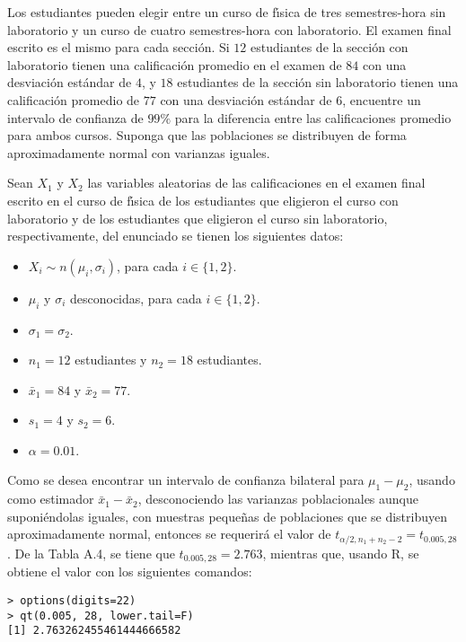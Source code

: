 \begin{enunciado}
 Los estudiantes pueden elegir entre un curso de f\'{\i}sica de tres semestres-hora sin laboratorio y un curso de cuatro semestres-hora con laboratorio. El examen final escrito es el mismo para cada secci\'on. Si $12$ estudiantes de la secci\'on con laboratorio tienen una calificaci\'on promedio en el examen de $84$ con una desviaci\'on est\'andar de $4$, y $18$ estudiantes de la secci\'on sin laboratorio tienen una calificaci\'on promedio de $77$ con una desviaci\'on est\'andar de $6$, encuentre un intervalo de confianza de $99\%$ para la diferencia entre las calificaciones promedio para ambos cursos. Suponga que las poblaciones se distribuyen de forma aproximadamente normal con varianzas iguales.
\end{enunciado}

\begin{solucion}
 Sean $X_1$ y $X_2$ las variables aleatorias de las calificaciones en el examen final escrito en el curso de f\'{\i}sica de los estudiantes que eligieron el curso con laboratorio y de los estudiantes que eligieron el curso sin laboratorio, respectivamente, del enunciado se tienen los siguientes datos:
 \begin{itemize}
  \item $X_i \sim n(\mu_i, \sigma_i)$, para cada $i\in\{ 1, 2 \}$.
  \item $\mu_i$ y $\sigma_i$ desconocidas, para cada $i \in \{ 1, 2 \}$.
  \item $\sigma_1 = \sigma_2$.
  \item $n_1 = 12$ estudiantes y $n_2 = 18$ estudiantes.
  \item $\bar{x}_1 = 84$ y $\bar{x}_2 = 77$.
  \item $s_1 = 4$ y $s_2 = 6$.
  \item $\alpha = 0.01$.
 \end{itemize}
 Como se desea encontrar un intervalo de confianza bilateral para $\mu_1 - \mu_2$, usando como estimador $\bar{x}_1 - \bar{x}_2$, desconociendo las varianzas poblacionales aunque suponi\'endolas iguales, con muestras peque\~nas de poblaciones que se distribuyen aproximadamente normal, entonces se requerir\'a el valor de $t_{\alpha/2,n_1+n_2-2} = t_{0.005,28}$. De la Tabla A.4, se tiene que $t_{0.005,28} = 2.763$, mientras que, usando R, se obtiene el valor con los siguientes comandos:
 \begin{verbatim}
> options(digits=22)
> qt(0.005, 28, lower.tail=F)
[1] 2.763262455461444666582
 \end{verbatim}

\end{solucion}
